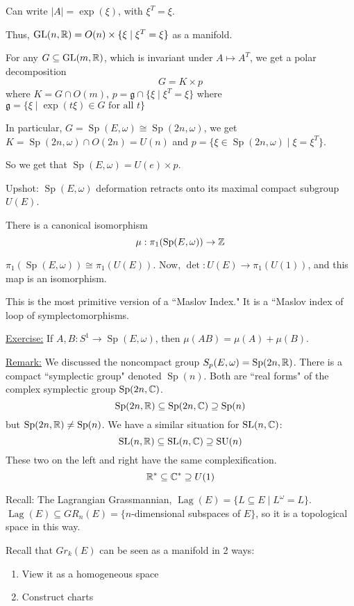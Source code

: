 \documentclass[x11names,reqno,14pt]{extarticle}
\newcommand{\mk}[1]{\mathfrak{#1}}
\DeclareMathOperator{\SU}{SU}
\newcommand{\spew}{\Sp(E,\omega)}
\DeclareMathOperator{\Sp}{Sp}
\DeclareMathOperator{\Lag}{Lag}
\begin{document}
Can write $|A| = \exp(\xi)$, with $\xi^T = \xi$. 

Thus, ${\mathrm{GL}}(n,\mathbb{R}) = O(n)\times\{\xi \mid \xi^T = \xi\}$ as a manifold. 

For any $G \subseteq {\mathrm{GL}}(m,\mathbb{R})$, which is invariant under $A \mapsto A^T$, we get a polar decomposition 
\[
G = K\times p
\]
where $K = G\cap O(m)$, $p = \mk{g} \cap \{\xi \mid \xi^T = \xi \}$
where $\mk{g} = \{\xi \mid \exp(t\xi) \in G \text{ for all }t\}$

In particular, $G = \spew \cong \Sp(2n, \omega)$, we get $K = \Sp(2n,\omega) \cap O(2n) = U(n)$ and $p = \{\xi \in \Sp(2n, \omega) \mid \xi = \xi^T\}$. 

So we get that $\spew = U(e)\times p$. 

Upshot: $\spew$ deformation retracts onto its maximal compact subgroup $U(E)$. 

\cor

There is a canonical isomorphism 
\[
\mu: \pi_1(\spew)\to\Z
\]

\proof

$\pi_1(\spew) \cong \pi_1(U(E))$. Now, $\det:U(E) \to \pi_1(U(1))$, and this map is an isomorphism. 

This is the most primitive version of a ``Maslov Index." It is a ``Maslov index of loop of symplectomorphisms. 

\underline{Exercise:} If $A, B:S^1 \to \spew$, then $\mu(AB) = \mu(A) + \mu(B)$. 

\underline{Remark:} We discussed the noncompact group $S_p(E, \omega) = \Sp(2n,\R)$. There is a compact ``symplectic group" denoted $\Sp(n)$. Both are ``real forms" of the complex symplectic group $\Sp(2n, \C)$. 
\[
\Sp(2n, \R) \subseteq \Sp(2n,\C) \supseteq \Sp(n)
\]
but $\Sp(2n,\R)\neq\Sp(n)$. We have a similar situation for ${\mathrm{SL}}(n,\mathbb{C})$: 
\[
\SL(n,\R) \subseteq \SL(n,\C) \supseteq \SU(n)
\]
These two on the left and right have the same complexification.
\[
\mathbb{R}^* \subseteq \mathbb{C}^* \supseteq U(1)
\]

Recall: The Lagrangian Grassmannian, $\Lag(E) = \{L \subseteq E \mid L^\omega = L \}$. $\Lag(E) \subseteq GR_n(E) = \{n$-dimensional subspaces of $E\}$, so it is a topological space in this way. 

Recall that $Gr_k(E)$ can be seen as a manifold in 2 ways:
\begin{enumerate}[label=(\roman*)]

\item View it as a homogeneous space

\item Construct charts

\end{enumerate}
\end{document}
